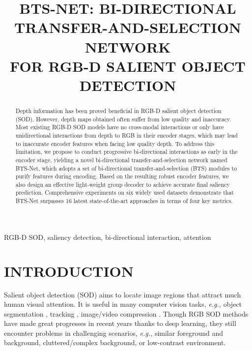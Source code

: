 \documentclass{article}
\begin{document}
\sloppy

\def\x{{\mathbf x}}
\def\L{{\cal L}}


\title{BTS-NET: BI-DIRECTIONAL TRANSFER-AND-SELECTION NETWORK\\ FOR RGB-D SALIENT OBJECT DETECTION}
\address{College of Computer Science, Sichuan University\\
   National Key Laboratory of Fundamental Science on Synthetic Vision, Sichuan University}

\maketitle


\begin{abstract}
Depth information has been proved beneficial in RGB-D salient object detection (SOD). However, depth maps obtained often suffer from low quality and inaccuracy. Most existing RGB-D SOD models have no cross-modal interactions or only have unidirectional interactions from depth to RGB in their encoder stages, which may lead to inaccurate encoder features when facing low quality depth. To address this limitation, we propose to conduct progressive bi-directional interactions as early in the encoder stage, yielding a novel bi-directional transfer-and-selection network named  BTS-Net, which adopts a set of bi-directional transfer-and-selection (BTS) modules to purify features during encoding. Based on the resulting robust encoder features, we also design an effective light-weight group decoder to achieve accurate final saliency prediction. Comprehensive experiments on six widely used datasets demonstrate that BTS-Net surpasses 16 latest state-of-the-art approaches in terms of four key metrics. 

\end{abstract}
\begin{keywords}
RGB-D SOD, saliency detection,  bi-directional interaction, attention
\end{keywords}
\vspace{-0.3cm}
\section{INTRODUCTION}
\label{sec:intro}\vspace{-0.2cm}
Salient object detection (SOD) aims to locate image regions that attract much human visual attention. It is useful in many computer vision tasks, \emph{e.g.,} object segmentation \cite{SaliencyAwareVO}, tracking \cite{2019Non}, image/video compression \cite{2010A}. Though RGB SOD methods have made great progresses in recent years thanks to deep learning\cite{RGBsurvey}, they still encounter problems in challenging scenarios, \emph{e.g.,} similar foreground and background, cluttered/complex background, or low-contrast environment. 
\end{document}
